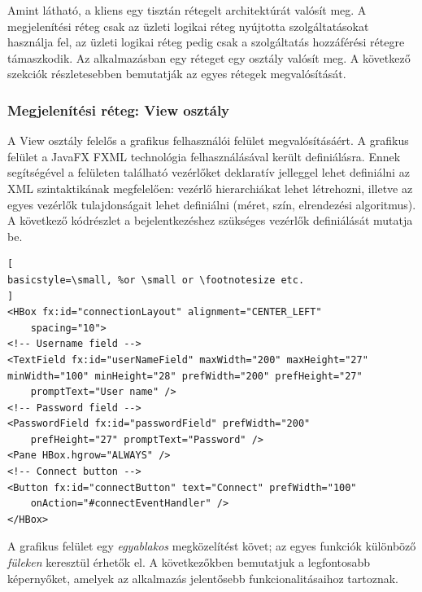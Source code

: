 \documentclass[11pt, a4paper]{article}
\begin{document}
	Amint látható, a kliens egy tisztán rétegelt architektúrát valósít meg. A megjelenítési réteg csak az üzleti logikai réteg  nyújtotta szolgáltatásokat használja fel, az üzleti logikai réteg pedig csak a szolgáltatás hozzáférési rétegre támaszkodik. Az alkalmazásban egy réteget egy osztály valósít meg. A következő szekciók részletesebben bemutatják az egyes rétegek megvalósítását.
     
     \subsubsection{Megjelenítési réteg: View osztály}
     A View osztály felelős a grafikus felhasználói felület megvalósításáért. A grafikus felület a JavaFX FXML technológia felhasználásával került definiálásra. Ennek segítségével a felületen található vezérlőket deklaratív jelleggel lehet definiálni az XML szintaktikának megfelelően: vezérlő hierarchiákat lehet létrehozni, illetve az egyes vezérlők tulajdonságait lehet definiálni (méret, szín, elrendezési algoritmus). A következő kódrészlet a bejelentkezéshez szükséges vezérlők definiálását mutatja be.
     
\begin{lstlisting}[
basicstyle=\small, %or \small or \footnotesize etc.
]
<HBox fx:id="connectionLayout" alignment="CENTER_LEFT"
	spacing="10">
<!-- Username field -->
<TextField fx:id="userNameField" maxWidth="200" maxHeight="27"
minWidth="100" minHeight="28" prefWidth="200" prefHeight="27" 
	promptText="User name" />	
<!-- Password field -->
<PasswordField fx:id="passwordField" prefWidth="200" 
	prefHeight="27" promptText="Password" />	
<Pane HBox.hgrow="ALWAYS" />
<!-- Connect button -->			
<Button fx:id="connectButton" text="Connect" prefWidth="100" 
	onAction="#connectEventHandler" />
</HBox>
\end{lstlisting}
     
     A grafikus felület egy \emph{egyablakos} megközelítést követ; az egyes funkciók különböző \emph{füleken} keresztül érhetők el. A következőkben bemutatjuk a legfontosabb képernyőket, amelyek az alkalmazás jelentősebb funkcionalitásaihoz tartoznak.
     
\end{document}
